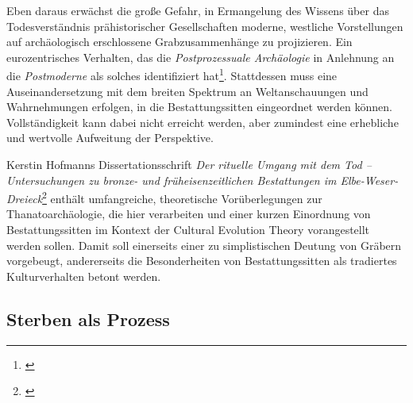 \documentclass[openany,twoside,twocolumn]{book}
\let\rmarkdownfootnote\footnote%
\def\footnote{\protect\rmarkdownfootnote}
\begin{document}
Eben daraus erwächst die große Gefahr, in Ermangelung des Wissens über
das Todesverständnis prähistorischer Gesellschaften moderne, westliche
Vorstellungen auf archäologisch erschlossene Grabzusammenhänge zu
projizieren. Ein eurozentrisches Verhalten, das die
\emph{Postprozessuale Archäologie} in Anlehnung an die
\emph{Postmoderne} als solches identifiziert hat\footnote{\textcite{atalay_indigenous_2006}}.
Stattdessen muss eine Auseinandersetzung mit dem breiten Spektrum an
Weltanschauungen und Wahrnehmungen erfolgen, in die Bestattungssitten
eingeordnet werden können. Vollständigkeit kann dabei nicht erreicht
werden, aber zumindest eine erhebliche und wertvolle Aufweitung der
Perspektive.

Kerstin Hofmanns Dissertationsschrift \emph{Der rituelle Umgang mit dem
Tod -- Untersuchungen zu bronze- und früheisenzeitlichen Bestattungen im
Elbe-Weser-Dreieck}\footnote{\textcite{hofmann_rituelle_2008}} enthält
umfangreiche, theoretische Vorüberlegungen zur Thanatoarchäologie, die
hier verarbeiten und einer kurzen Einordnung von Bestattungssitten im
Kontext der Cultural Evolution Theory vorangestellt werden sollen. Damit
soll einerseits einer zu simplistischen Deutung von Gräbern vorgebeugt,
andererseits die Besonderheiten von Bestattungssitten als tradiertes
Kulturverhalten betont werden.

\hypertarget{sterben-als-prozess}{%
\subsection{Sterben als Prozess}\label{sterben-als-prozess}}
\end{document}
